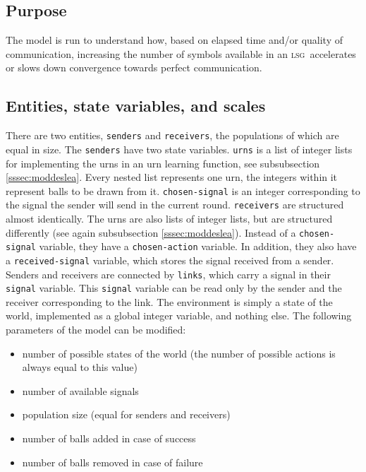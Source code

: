 \documentclass[
	DIV=calc,
	BCOR=0mm,
	pagesize,
]{scrartcl}
\newcommand{\code}[1]{\texttt{#1}}
\newcommand{\lsg}{\textsc{lsg}}
\begin{document}
\subsection{Purpose}
\label{ssec:modpur}
The model is run to understand how, based on elapsed time and/or quality of communication, increasing the number of symbols available in an \lsg\ accelerates or slows down convergence towards perfect communication.

\subsection{Entities, state variables, and scales}
\label{ssec:modent}
There are two entities, \code{senders} and \code{receivers}, the populations of which are equal in size.
The \code{senders} have two state variables.
\code{urns} is a list of integer lists for implementing the urns in an urn learning function, see subsubsection \ref{sssec:moddeslea}.
Every nested list represents one urn, the integers within it represent balls to be drawn from it.
\code{chosen-signal} is an integer corresponding to the signal the sender will send in the current round.
\code{receivers} are structured almost identically.
The urns are also lists of integer lists, but are structured differently (see again subsubsection \ref{sssec:moddeslea}).
Instead of a \code{chosen-signal} variable, they have a \code{chosen-action} variable.
In addition, they also have a \code{received-signal} variable, which stores the signal received from a sender.
Senders and receivers are connected by \code{links}, which carry a signal in their \code{signal} variable.
This \code{signal} variable can be read only by the sender and the receiver corresponding to the link.
The environment is simply a state of the world, implemented as a global integer variable, and nothing else.
The following parameters of the model can be modified:
\begin{itemize}
	\item number of possible states of the world (the number of possible actions is always equal to this value)
	\item number of available signals
	\item population size (equal for senders and receivers)
	\item number of balls added in case of success
	\item number of balls removed in case of failure
\end{itemize}
\end{document}
